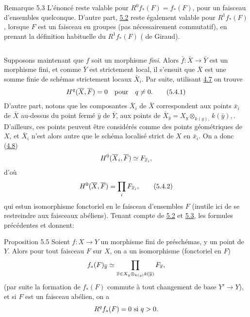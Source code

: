 \documentclass[10pt]{../fichiers-configuration-latex/smfart}
\begin{document}
\begin{enonce*}[remark]{Remarque 5.3}
L'énoncé reste valable pour $R^{0} f_{\ast} (F) = f_{\ast} (F)$, pour
un faisceau d'ensembles quelconque. D'autre part, \hyperref[VIII.thm5.2]{5.2} reste également
valable pour $R^{1} f_{\ast} (F)$, lorsque $F$ est un faisceau en
groupes (pas nécessairement commutatif), en prenant la définition
habituelle du $R^1 f_{\ast} (F)$ (\cf {} de Giraud).
\end{enonce*}

\setcounter{subsection}{3}
\subsection{}

Supposons maintenant que $f$ soit un morphisme \emph{fini}. Alors
$\bar{f} : \bar{X} \to \bar{Y}$ est un morphisme fini, et comme
$\bar{Y}$ est strictement local, il s'ensuit que $\bar{X}$ est une
somme finie de schémas strictement locaux $\bar{X}_i$. Par suite,
utilisant \hyperref[VIII.cor4.7]{4.7} on trouve
\begin{equation*}
H^q (\overline{X}, \overline{F}) = 0\quad \mbox{pour}\quad q \neq 0{}.\tag{5.4.1}
\end{equation*}
D'autre part, notons que les composantes $\bar{X}_i$ de $\bar{X}$
correspondent aux points $\bar{x}_i$ de $\bar{X}$ au-dessus du point
fermé $\bar{y}$ de $\bar{Y}$, \ie aux points de $\bar{X}_{\bar{y}} =
X_{y} \otimes_{k(y),} k(\bar{y}),$. D'ailleurs, ces points peuvent
être considérés comme des points géométriques de $X$, et $\bar{X}_i$
n'est alors autre que le schéma localisé strict de $X$ en
$\bar{x}_i$. On a donc (\hyperref[VIII.cor4.8]{4.8})
$$
H^0 (\overline{X}_i, \overline{F}) \simeq F_{\overline{x}_i}{},
$$
d'où
\begin{equation*}
H^0 (\overline{X}, \overline{F}) = \mathop{\prod}_i F_{\overline{x}_i}{},\tag{5.4.2}
\end{equation*}
qui est\pageoriginale un isomorphisme fonctoriel en le faisceau d'ensembles $F$
(inutile ici de se restreindre aux faisceaux abéliens). Tenant compte
de \hyperref[VIII.thm5.2]{5.2} et \hyperref[VIII.rem5.3]{5.3}, les formules précédentes  et  donnent:

\begin{enonce*}{Proposition 5.5}
Soient $f : X \to Y$ un morphisme fini de préschémas, y un point de
$Y$. Alors pour tout faisceau $F$ sur $X$, on a un isomorphisme
(fonctoriel en $F$)
$$
f_{\ast} (F)_{\overline{y}} \simeq \prod_{\overline{x} \in X_{y}\otimes_{k(y)}
k(\overline{y})} F_{\overline{x}}{},
$$
(par suite la formation de $f_{\ast} (F)$ commute à tout changement de
base $Y'\to Y$), et si $F$ est un faisceau abélien, on a
$$
R^q f_{\ast} (F) = 0 \mbox{ si } q > 0{}.
$$
\end{enonce*}
\end{document}
